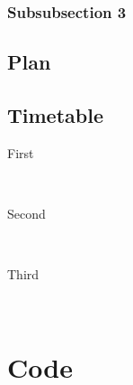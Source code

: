 \documentclass[11pt]{article} %
\theoremstyle{plain}
\theoremstyle{definition}
\theoremstyle{remark}
\begin{document}

\subsubsection{Subsubsection 3} %

\subsection{Plan}

\subsection{Timetable}

\begin{description} %

\item[First] \hfill \\

\item[Second] \hfill \\

\item[Third] \hfill \\

\end{description} 






\appendix

\section{Code}


\printindex

\end{document}
